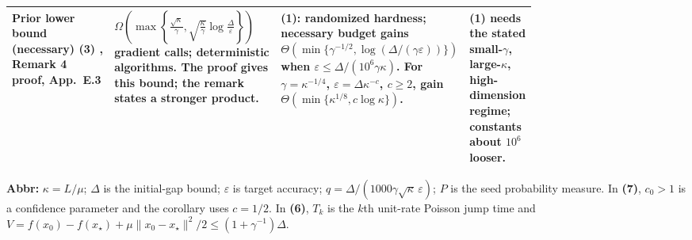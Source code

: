 \begin{table}[tp]
\begin{threeparttable}
\begin{tabularx}{\linewidth}{@{}>{\raggedright\arraybackslash}p{0.20\linewidth}>{\raggedright\arraybackslash}p{0.32\linewidth}>{\raggedright\arraybackslash}p{0.25\linewidth}>{\raggedright\arraybackslash}X@{}}
\midrule[1.2pt]
\textbf{Prior lower bound (necessary)}\newline
\textbf{(3)} \citep{hdsqHinderV3Verified}, Remark 4 proof, App.~E.3
& $\Omega\!\left(\max\!\left\{\frac{\sqrt\kappa}{\gamma},\sqrt{\frac\kappa\gamma}\log\frac\Delta\varepsilon\right\}\right)$ gradient calls; deterministic algorithms. The proof gives this bound; the remark states a stronger product.
& \textbf{(1)}: randomized hardness; necessary budget gains $\Theta(\min\{\gamma^{-1/2},\log(\Delta/(\gamma\varepsilon))\})$ when $\varepsilon\le\Delta/(10^6\gamma\kappa)$.
For $\gamma=\kappa^{-1/4}$, $\varepsilon=\Delta\kappa^{-c}$, $c\ge2$, gain $\Theta(\min\{\kappa^{1/8},c\log\kappa\})$.
& \textbf{(1)} needs the stated small-$\gamma$, large-$\kappa$, high-dimension regime; constants about $10^6$ looser. \\

\bottomrule
\end{tabularx}
\begin{tablenotes}[flushleft]\footnotesize
\item[] \textbf{Abbr:} $\kappa=L/\mu$; $\Delta$ is the initial-gap bound; $\varepsilon$ is target accuracy; $q=\Delta/(1000\gamma\sqrt\kappa\,\varepsilon)$; $P$ is the seed probability measure. In \textbf{(7)}, $c_0>1$ is a confidence parameter and the corollary uses $c=1/2$. In \textbf{(6)}, $T_k$ is the $k$th unit-rate Poisson jump time and $V=f(x_0)-f(x_\star)+\mu\|x_0-x_\star\|^2/2\le(1+\gamma^{-1})\Delta$.
\end{tablenotes}
\end{threeparttable}
\end{table}
\clearpage
